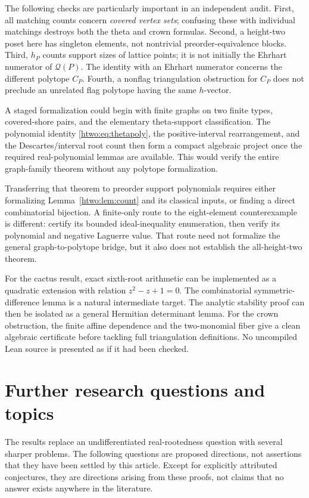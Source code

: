 \documentclass[11pt]{article}
\numberwithin{equation}{section}
\theoremstyle{definition}
\begin{document}
The following checks are particularly important in an independent audit.
First, all matching counts concern \emph{covered vertex sets}; confusing
these with individual matchings destroys both the theta and crown
formulas. Second, a height-two poset here has singleton elements, not
nontrivial preorder-equivalence blocks. Third, $h_P$ counts support sizes
of lattice points; it is not initially the Ehrhart numerator of
$\mathcal Q(P)$. The identity with an Ehrhart numerator concerns the
different polytope $C_P$. Fourth, a nonflag triangulation obstruction for
$C_P$ does not preclude an unrelated flag polytope having the same
$h$-vector.

A staged formalization could begin with finite graphs on two finite types,
covered-shore pairs, and the elementary theta-support classification.
The polynomial identity \eqref{htwo:eq:thetapoly}, the positive-interval
rearrangement, and the Descartes/interval root count then form a compact
algebraic project once the required real-polynomial lemmas are available.
This would verify the entire graph-family theorem without any polytope
formalization.

Transferring that theorem to preorder support polynomials requires either
formalizing Lemma~\ref{htwo:lem:count} and its classical inputs, or finding a
direct combinatorial bijection. A finite-only route to the eight-element
counterexample is different: certify its bounded ideal-inequality
enumeration, then verify its polynomial and negative Laguerre value.
That route need not formalize the general graph-to-polytope bridge, but it
also does not establish the all-height-two theorem.

For the cactus result, exact sixth-root arithmetic can be implemented as
a quadratic extension with relation $z^2-z+1=0$. The combinatorial
symmetric-difference lemma is a natural intermediate target. The analytic
stability proof can then be isolated as a general Hermitian determinant
lemma. For the crown obstruction, the finite affine dependence and the
two-monomial fiber give a clean algebraic certificate before tackling
full triangulation definitions. No uncompiled Lean source is presented
as if it had been checked.

\section{Further research questions and topics}\label{htwo:sec:future}

The results replace an undifferentiated real-rootedness question with
several sharper problems. The following questions are proposed directions,
not assertions that they have been settled by this article. Except for
explicitly attributed conjectures, they are directions arising from these
proofs, not claims that no answer exists anywhere in the literature.
\end{document}
